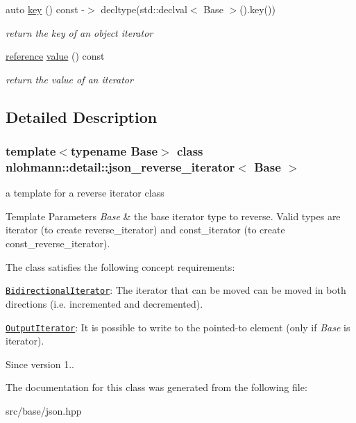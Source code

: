 \begin{DoxyCompactItemize}
\mbox{\label{classnlohmann_1_1detail_1_1json__reverse__iterator_adc648a641e8e9a1072c5abd56ad06401}} 
auto \mbox{\hyperlink{classnlohmann_1_1detail_1_1json__reverse__iterator_adc648a641e8e9a1072c5abd56ad06401}{key}} () const -\/$>$ decltype(std\+::declval$<$ Base $>$().key())
\begin{DoxyCompactList}\small\item\em return the key of an object iterator \end{DoxyCompactList}\item 
\mbox{\label{classnlohmann_1_1detail_1_1json__reverse__iterator_ae22803d442d483041d17239615f83b58}} 
\mbox{\hyperlink{classnlohmann_1_1detail_1_1json__reverse__iterator_a42f51a69bac7b2aebb613b2164e457f1}{reference}} \mbox{\hyperlink{classnlohmann_1_1detail_1_1json__reverse__iterator_ae22803d442d483041d17239615f83b58}{value}} () const
\begin{DoxyCompactList}\small\item\em return the value of an iterator \end{DoxyCompactList}\end{DoxyCompactItemize}


\subsection{Detailed Description}
\subsubsection*{template$<$typename Base$>$\newline
class nlohmann\+::detail\+::json\+\_\+reverse\+\_\+iterator$<$ Base $>$}

a template for a reverse iterator class 


\begin{DoxyTemplParams}{Template Parameters}
{\em Base} & the base iterator type to reverse. Valid types are iterator (to create reverse\+\_\+iterator) and const\+\_\+iterator (to create const\+\_\+reverse\+\_\+iterator).\\
\hline
\end{DoxyTemplParams}
The class satisfies the following concept requirements\+:
\begin{DoxyItemize}
\item \href{http://en.cppreference.com/w/cpp/concept/BidirectionalIterator}{\tt Bidirectional\+Iterator}\+: The iterator that can be moved can be moved in both directions (i.\+e. incremented and decremented).
\item \href{http://en.cppreference.com/w/cpp/concept/OutputIterator}{\tt Output\+Iterator}\+: It is possible to write to the pointed-\/to element (only if {\itshape Base} is iterator).
\end{DoxyItemize}

\begin{DoxySince}{Since}
version 1.. 
\end{DoxySince}


The documentation for this class was generated from the following file\+:\begin{DoxyCompactItemize}
\item 
src/base/json.\+hpp\end{DoxyCompactItemize}
